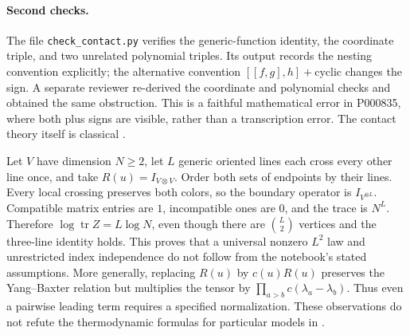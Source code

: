 \paragraph{Second checks.}
The file \texttt{check\_contact.py} verifies the generic-function identity, the coordinate triple, and two unrelated polynomial triples. Its output records the nesting convention explicitly; the alternative convention \([[f,g],h]+\text{cyclic}\) changes the sign. A separate reviewer re-derived the coordinate and polynomial checks and obtained the same obstruction. This is a faithful mathematical error in P000835, where both plus signs are visible, rather than a transcription error. The contact theory itself is classical \citep[Sec.~4]{kirillov1976local}.

\begin{example}\ours{}
Let \(V\) have dimension \(N\ge2\), let \(L\) generic oriented lines each cross every other line once, and take \(R(u)=I_{V\otimes V}\). Order both sets of endpoints by their lines. Every local crossing preserves both colors, so the boundary operator is \(I_{V^{\otimes L}}\). Compatible matrix entries are \(1\), incompatible ones are \(0\), and the trace is \(N^L\). Therefore \(\log\operatorname{tr}Z=L\log N\), even though there are \(\binom L2\) vertices and the three-line identity holds. This proves that a universal nonzero \(L^2\) law and unrestricted index independence do not follow from the notebook's stated assumptions. More generally, replacing \(R(u)\) by \(c(u)R(u)\) preserves the Yang--Baxter relation but multiplies the tensor by \(\prod_{a>b}c(\lambda_a-\lambda_b)\). Thus even a pairwise leading term requires a specified normalization. These observations do not refute the thermodynamic formulas for particular models in \citet[Secs.~10.17 and 11.4]{baxter1982exactly}.
\end{example}

